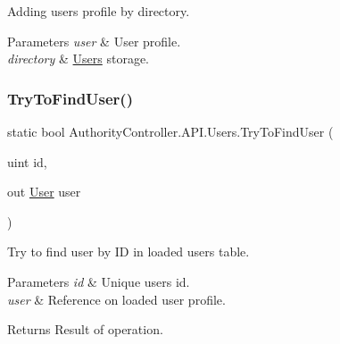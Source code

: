 Adding user\textquotesingle{}s profile by directory. 


\begin{DoxyParams}{Parameters}
{\em user} & User profile.\\
\hline
{\em directory} & \mbox{\hyperlink{class_authority_controller_1_1_a_p_i_1_1_users}{Users}} storage.\\
\hline
\end{DoxyParams}
\mbox{\label{class_authority_controller_1_1_a_p_i_1_1_users_abd0e68d6f6f3c77682e995b939daaea9}} 
\subsubsection{\texorpdfstring{Try\+To\+Find\+User()}{TryToFindUser()}\hspace{0.1cm}{\footnotesize\ttfamily [1/2]}}
{\footnotesize\ttfamily static bool Authority\+Controller.\+A\+P\+I.\+Users.\+Try\+To\+Find\+User (\begin{DoxyParamCaption}\item[{uint}]{id,  }\item[{out \mbox{\hyperlink{class_authority_controller_1_1_data_1_1_personal_1_1_user}{User}}}]{user }\end{DoxyParamCaption})\hspace{0.3cm}{\ttfamily [static]}}



Try to find user by ID in loaded users table. 


\begin{DoxyParams}{Parameters}
{\em id} & Unique user\textquotesingle{}s id.\\
\hline
{\em user} & Reference on loaded user profile.\\
\hline
\end{DoxyParams}
\begin{DoxyReturn}{Returns}
Result of operation.
\end{DoxyReturn}
\mbox{\label{class_authority_controller_1_1_a_p_i_1_1_users_a3e152e5b11636c72e5e9610906de986a}} 
